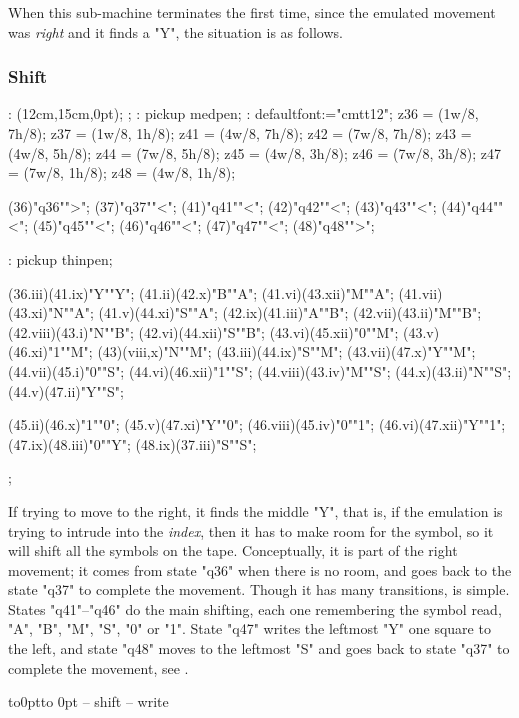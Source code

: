 When this sub-machine terminates the first time,
since the emulated movement was {\em right} and
it finds a "Y", the situation is as follows.

\nextsituation

\vfill\break


\subsubsection{Shift}

\MT:
\MTbeginfig(12cm,15cm,0pt);
\MTresetpa;
\MT: pickup medpen;
\MT: defaultfont:="cmtt12";
\MTcode
 z36 = (1w/8, 7h/8);
 z37 = (1w/8, 1h/8);
 z41 = (4w/8, 7h/8);
 z42 = (7w/8, 7h/8);
 z43 = (4w/8, 5h/8);
 z44 = (7w/8, 5h/8);
 z45 = (4w/8, 3h/8);
 z46 = (7w/8, 3h/8);
 z47 = (7w/8, 1h/8);
 z48 = (4w/8, 1h/8);

\MTstate(36)"q36"">";
\MTstate(37)"q37""<";
\MTstate(41)"q41""<";
\MTstate(42)"q42""<";
\MTstate(43)"q43""<";
\MTstate(44)"q44""<";
\MTstate(45)"q45""<";
\MTstate(46)"q46""<";
\MTstate(47)"q47""<";
\MTstate(48)"q48"">";

\MT: pickup thinpen;

\MTinput(36.iii)(41.ix)"Y""Y";
\MTinput(41.ii)(42.x)"B""A";
\MTinput(41.vi)(43.xii)"M""A";
\MTinput(41.vii)(43.xi)"N""A";
\MTinput(41.v)(44.xi)"S""A";
\MTinput(42.ix)(41.iii)"A""B";
\MTinput(42.vii)(43.ii)"M""B";
\MTinput(42.viii)(43.i)"N""B";
\MTinput(42.vi)(44.xii)"S""B";
\MTinput(43.vi)(45.xii)"0""M";
\MTinput(43.v)(46.xi)"1""M";
\MTauto(43)(viii,x)"N""M";
\MTinput(43.iii)(44.ix)"S""M";
\MTinput(43.vii)(47.x)"Y""M";
\MTinput(44.vii)(45.i)"0""S";
\MTinput(44.vi)(46.xii)"1""S";
\MTinput(44.viii)(43.iv)"M""S";
\MTinput(44.x)(43.ii)"N""S";
\MTinput(44.v)(47.ii)"Y""S";

\MTinput(45.ii)(46.x)"1""0";
\MTinput(45.v)(47.xi)"Y""0";
\MTinput(46.viii)(45.iv)"0""1";
\MTinput(46.vi)(47.xii)"Y""1";
\MTinput(47.ix)(48.iii)"0""Y";
\MTinput(48.ix)(37.iii)"S""S";

\MTendfig;

If trying to move to the right, it finds the middle "Y",
that is, if the emulation is trying to intrude into the {\em index},
then it has to make room for the symbol,
so it will shift all the symbols on the tape.
Conceptually, it is part of the right movement;
it comes from state "q36" when there is no room,
and goes back to the state "q37" to complete the movement.
Though it has many transitions, is simple.
States "q41"--"q46" do the main shifting,
each one remembering the symbol read, "A", "B", "M", "S", "0" or "1".
State "q47" writes the leftmost "Y" one square to the left,
and state "q48" moves to the leftmost "S" and
goes back to state "q37" to complete the movement,
 see .
\par\kern-12pt\vbox to0pt{\kern-6pt\hbox to 0pt{\kern4cm\box\MTbox\hss}\vss}
-- shift
-- write

